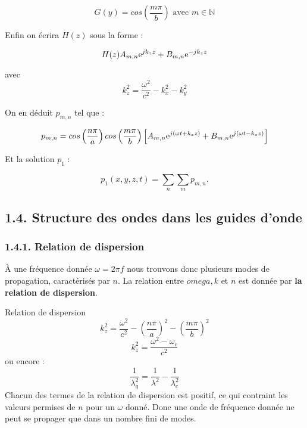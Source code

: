 \documentclass[french, a4paper, 10pt, twocolumn, landscape]{article}
\begin{document}
\begin{equation}
	G(y) = cos\left(\frac{m\pi}{b}\right) \textrm{ avec } m\in\mathbb{N}
\end{equation}

Enfin on écrira $H(z)$ sous la forme : 

\begin{equation}
	H(z) A_{m,n}{\rm e}^{jk_z z}+ B_{m,n}{\rm e}^{-jk_z z}
\end{equation}

avec \[k_z^2 = \frac{\omega^2}{c^2}-k_x^2 - k_y^2\]

On en déduit $p_{m,n}$ tel que : 


\begin{equation}
	p_{m,n} = cos\left(\frac{n\pi}{a}\right)cos\left(\frac{m\pi}{b}\right)\left[A_{m,n}{\rm e}^{j\left(\omega t+ k_z z\right)}+ B_{m,n}{\rm e}^{j\left(\omega t- k_z z\right)}\right]
\end{equation}

Et la solution $p_1$ : 

\begin{equation}
	p_1(x,y,z,t) = \sum_n\sum_m p_{m,n}.
\end{equation}

\subsection*{1.4. Structure des ondes dans les guides d'onde}
\subsubsection*{1.4.1. Relation de dispersion}

À une fréquence donnée $\omega = 2\pi f$ nous trouvons donc plusieurs modes de propagation, caractérisés par $n$. La relation entre $omega, k$ et $n$ est donnée par \textbf{la relation de dispersion}.

\begin{Resultat}{Relation de dispersion}
	\[k_z^2 = \frac{\omega^2}{c^2}-\left(\frac{n\pi}{a}\right)^2-\left(\frac{m\pi}{b}\right)^2\]
	\begin{equation}
		k_z^2 = \frac{\omega^2-\omega_c}{c^2}
	\end{equation}
	ou encore : 
	\begin{equation}
		\frac{1}{\lambda_g^2} = \frac{1}{\lambda^2}-\frac{1}{\lambda_c^2}
	\end{equation}
	Chacun des termes de la relation de dispersion est positif, ce qui contraint les valeurs permises de $n$ pour un $\omega$ donné. Donc une onde de fréquence donnée ne peut se propager que dans un nombre fini de modes.
\end{Resultat}
\end{document}
